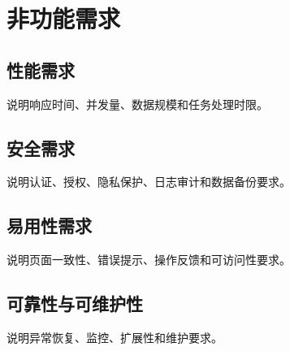 \section{非功能需求}

\subsection{性能需求}

说明响应时间、并发量、数据规模和任务处理时限。

\subsection{安全需求}

说明认证、授权、隐私保护、日志审计和数据备份要求。

\subsection{易用性需求}

说明页面一致性、错误提示、操作反馈和可访问性要求。

\subsection{可靠性与可维护性}

说明异常恢复、监控、扩展性和维护要求。
